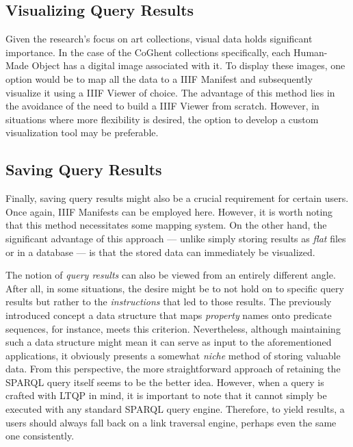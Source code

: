 \documentclass[conference]{IEEEtran}
\begin{document}
\subsection{Visualizing Query Results}
Given the research's focus on art collections, visual data holds significant importance. In the case of the CoGhent collections specifically, each Human-Made Object has a digital image associated with it. To display these images, one option would be to map all the data to a IIIF Manifest and subsequently visualize it using a IIIF Viewer of choice. The advantage of this method lies in the avoidance of the need to build a IIIF Viewer from scratch. However, in situations where more flexibility is desired, the option to develop a custom visualization tool may be preferable.

\subsection{Saving Query Results}
Finally, saving query results might also be a crucial requirement for certain users. Once again, IIIF Manifests can be employed here. However, it is worth noting that this method necessitates some mapping system. On the other hand, the significant advantage of this approach — unlike simply storing results as \textit{flat} files or in a database — is that the stored data can immediately be visualized.

The notion of \textit{query results} can also be viewed from an entirely different angle. After all, in some situations, the desire might be to not hold on to specific query results but rather to the \textit{instructions} that led to those results. The previously introduced concept a data structure that maps \textit{property} names onto predicate sequences, for instance, meets this criterion. Nevertheless, although maintaining such a data structure might mean it can serve as input to the aforementioned applications, it obviously presents a somewhat \textit{niche} method of storing valuable data. From this perspective, the more straightforward approach of retaining the SPARQL query itself seems to be the better idea. However, when a query is crafted with LTQP in mind, it is important to note that it cannot simply be executed with any standard SPARQL query engine. Therefore, to yield results, a users should always fall back on a link traversal engine, perhaps even the same one consistently.
\end{document}
